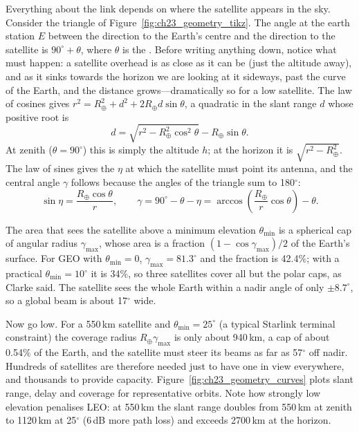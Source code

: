 Everything about the link depends on where the satellite appears in the sky. Consider the
triangle of Figure~\ref{fig:ch23_geometry_tikz}. The angle at the earth station $E$ between
the direction to the Earth's centre and the direction to the satellite is $90^\circ+\theta$,
where $\theta$ is the . Before writing anything down, notice what must
happen: a satellite overhead is as close as it can be (just the altitude away), and as it sinks
towards the horizon we are looking at it sideways, past the curve of the Earth, and the distance
grows---dramatically so for a low satellite. The law of cosines gives
$r^2=R_\oplus^2+d^2+2R_\oplus d\sin\theta$, a quadratic in the slant range $d$ whose positive
root is
\begin{equation}
d=\sqrt{r^2-R_\oplus^2\cos^2\theta}-R_\oplus\sin\theta .
\label{eq:ch23:slant}
\end{equation}
At zenith ($\theta=90^\circ$) this is simply the altitude $h$; at the horizon it is
$\sqrt{r^2-R_\oplus^2}$. The law of sines gives the  $\eta$ at which the
satellite must point its antenna, and the central angle $\gamma$ follows because the angles of
the triangle sum to 180$^\circ$:
\begin{equation}
\sin\eta=\frac{R_\oplus\cos\theta}{r},\qquad
\gamma=90^\circ-\theta-\eta=\arccos\!\left(\frac{R_\oplus}{r}\cos\theta\right)-\theta .
\label{eq:ch23:central}
\end{equation}

The area that sees the satellite above a minimum elevation $\theta_{\min}$ is a spherical cap
of angular radius $\gamma_{\max}$, whose area is a fraction $(1-\cos\gamma_{\max})/2$ of the
Earth's surface. For GEO with $\theta_{\min}=0$, $\gamma_{\max}=81.3^\circ$ and the fraction is
42.4\%; with a practical $\theta_{\min}=10^\circ$ it is 34\%, so three satellites cover all
but the polar caps, as Clarke said. The satellite sees the whole Earth within a nadir angle of
only $\pm8.7^\circ$, so a global beam is about 17$^\circ$ wide.

Now go low. For a 550\,km satellite and $\theta_{\min}=25^\circ$ (a typical Starlink terminal
constraint) the coverage radius $R_\oplus\gamma_{\max}$ is only about 940\,km, a cap of about 0.54\%
of the Earth, and the satellite must steer its beams as far as 57$^\circ$ off nadir. Hundreds of
satellites are therefore needed just to have one in view everywhere, and thousands to provide
capacity. Figure~\ref{fig:ch23_geometry_curves} plots slant range, delay and coverage for
representative orbits. Note how strongly low elevation penalises LEO: at 550\,km the slant range
doubles from 550\,km at zenith to 1120\,km at 25$^\circ$ (6\,dB more path loss) and exceeds 2700\,km
at the horizon.

